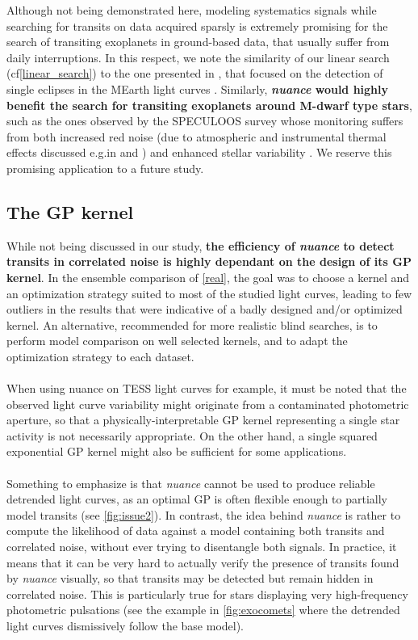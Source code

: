 \documentclass[modern]{aastex631}
\newcommand{\nuancemethod}{\textit{nuance}}
\newcommand{\nuancecode}{\textsf{nuance}}
\begin{document}
Although not being demonstrated here, modeling systematics signals while searching for transits on data acquired sparsly is extremely promising for the search of transiting exoplanets in ground-based data, that usually suffer from daily interruptions. In this respect, we note the similarity of our linear search (cf\;\autoref{linear_search}) to the one presented in \citealt{Berta2012}, that focused on the detection of single eclipses in the MEarth light curves \citep{Irwin2009}. Similarly, \textbf{\nuancemethod{} would highly benefit the search for transiting exoplanets around M-dwarf type stars}, such as the ones observed by the SPECULOOS survey \citep{speculoos} whose monitoring suffers from both increased red noise (due to atmospheric and instrumental thermal effects discussed e.g.\;in \citealt{Berta2012} and  \citealt{Pedersen2023}) and enhanced stellar variability \citep{Murray2020}. We reserve this promising application to a future study.

\subsection{The GP kernel}
While not being discussed in our study, \textbf{the efficiency of \nuancemethod{} to detect transits in correlated noise is highly dependant on the design of its GP kernel}. In the ensemble comparison of \autoref{real}, the goal was to choose a kernel and an optimization strategy suited to most of the studied light curves, leading to few outliers in the results that were indicative of a badly designed and/or optimized kernel. An alternative, recommended for more realistic blind searches, is to perform model comparison on well selected kernels, and to adapt the optimization strategy to each dataset.\\\\
When using \nuancecode{} on TESS light curves for example, it must be noted that the observed light curve variability might originate from a contaminated photometric aperture, so that a physically-interpretable GP kernel representing a single star activity is not necessarily appropriate. On the other hand, a single squared exponential GP kernel might also be sufficient for some applications.\\\\
Something to emphasize is that \nuancemethod{} cannot be used to produce reliable detrended light curves, as an optimal GP is often flexible enough to partially model transits (see \autoref{fig:issue2}). 
In contrast, the idea behind \nuancemethod{} is rather to compute the likelihood of data against a model containing both transits and correlated noise, without ever trying to disentangle both signals. In practice, it means that it can be very hard to actually verify the presence of transits found by \nuancemethod{} visually, so that transits may be detected but remain hidden in correlated noise. This is particularly true for stars displaying very high-frequency photometric pulsations (see the example in \autoref{fig:exocomets} where the detrended light curves dismissively follow the base model).
\end{document}
